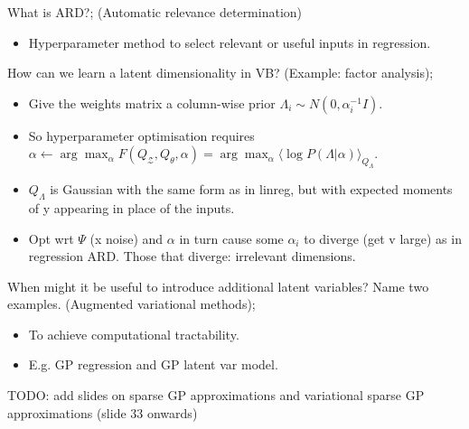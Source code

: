 \documentclass{article}
\begin{document}
What is ARD?; (Automatic relevance determination) \begin{itemize} \item Hyperparameter method to select relevant or useful inputs in regression.  \end{itemize} 

How can we learn a latent dimensionality in VB? (Example: factor analysis); \begin{itemize} \item Give the weights matrix a column-wise prior $\Lambda_i \sim N(0, \alpha_i^{-1}I)$.  \item So hyperparameter optimisation requires $\alpha \leftarrow \arg\max_{\alpha} F(Q_\mathcal{Z}, Q_\theta, \alpha) = \arg\max_\alpha \langle \log P(\Lambda |\alpha)\rangle_{Q_\Lambda}$.  \item $Q_\Lambda$ is Gaussian with the same form as in linreg, but with expected moments of y appearing in place of the inputs.  \item Opt wrt $\Psi$ (x noise) and $\alpha$ in turn cause some $\alpha_i$ to diverge (get v large) as in regression ARD. Those that diverge: irrelevant dimensions.  \end{itemize}

When might it be useful to introduce additional latent variables? Name two examples. (Augmented variational methods); \begin{itemize} \item To achieve computational tractability.  \item E.g. GP regression and GP latent var model.  \end{itemize}

TODO: add slides on sparse GP approximations and variational sparse GP approximations (slide 33 onwards)
\end{document}
